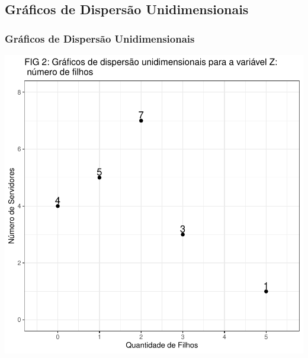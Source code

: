 \documentclass[14pt,aspectratio=1610]{beamer}
\begin{document}
\subsection{Gráficos de Dispersão Unidimensionais}
\begin{frame}{}
\frametitle{Gráficos de Dispersão Unidimensionais}
\begin{block}{}
	\vspace{-0.5cm}
\begin{center}
\includegraphics{Aula5-point1}
\end{center}
\end{block}
\end{frame}
\end{document}
